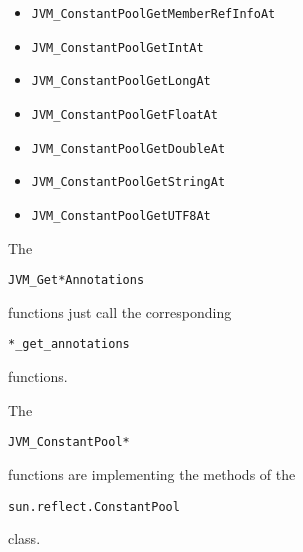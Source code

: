\documentclass[a4paper, 10pt, titlepage]{scrartcl} %
\begin{document}
\begin{itemize}
 \item \begin{scriptsize}\verb|JVM_ConstantPoolGetMemberRefInfoAt|\end{scriptsize}
 \item \begin{scriptsize}\verb|JVM_ConstantPoolGetIntAt|\end{scriptsize}
 \item \begin{scriptsize}\verb|JVM_ConstantPoolGetLongAt|\end{scriptsize}
 \item \begin{scriptsize}\verb|JVM_ConstantPoolGetFloatAt|\end{scriptsize}
 \item \begin{scriptsize}\verb|JVM_ConstantPoolGetDoubleAt|\end{scriptsize}
 \item \begin{scriptsize}\verb|JVM_ConstantPoolGetStringAt|\end{scriptsize}
 \item \begin{scriptsize}\verb|JVM_ConstantPoolGetUTF8At|\end{scriptsize}
\end{itemize}

The \begin{scriptsize}\verb|JVM_Get|\hspace{0.0pt}\verb|*|\hspace{0.0pt}\verb|Annotations|\end{scriptsize} functions just call the corresponding \begin{scriptsize}\verb||\hspace{0.0pt}\verb|*|\hspace{0.0pt}\verb|_get_annotations|\end{scriptsize}
functions.

The \begin{scriptsize}\verb|JVM_ConstantPool|\hspace{0.0pt}\verb|*|\hspace{0.0pt}\verb||\end{scriptsize} functions are implementing the methods of the
\begin{scriptsize}\verb|sun|\hspace{0.0pt}\verb|.|\hspace{0.0pt}\verb|reflect|\hspace{0.0pt}\verb|.|\hspace{0.0pt}\verb|ConstantPool|\end{scriptsize} class.
\end{document}
